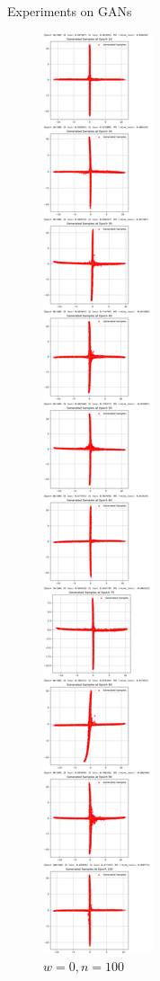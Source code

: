 \documentclass[final]{beamer}
\newlength{\colwidth}
\begin{document}
\begin{frame}[t]
\begin{columns}[t]
\begin{column}{\colwidth}
\begin{block}{Experiments on GANs}
\begin{figure}
\begin{minipage}{0.19\textwidth}
    \caption{$w=0,n=100$ }
    \end{minipage}
    \begin{minipage}{0.19\textwidth}
    \centering
    \centering
    \includegraphics[width=1\linewidth]{gan_cross/Jietu20250101-003251@2x.png}

\end{minipage}
\end{figure}
\end{block}
\end{column}
\end{columns}
\end{frame}
\end{document}
